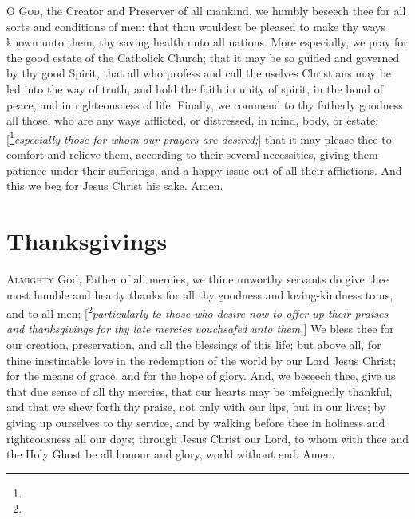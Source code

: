 \lettrine{O}{ God,} the Creator and Preserver of all mankind, we humbly beseech thee for all sorts and conditions of men: that thou wouldest be pleased to make thy ways known unto them, thy saving health unto all nations. More especially, we pray for the good estate of the Catholick Church; that it may be so guided and governed by thy good Spirit, that all who profess and call themselves Christians may be led into the way of truth, and hold the faith in unity of spirit, in the bond of peace,
and in righteousness of life. Finally, we commend to thy fatherly goodness all those, who are any ways afflicted, or distressed, in
mind, body, or estate; [\footnote{}\emph{especially those for whom our prayers are desired;}] that it may please thee to comfort and relieve them, according to their several necessities, giving them patience under their sufferings, and a happy issue out of all their afflictions. And this we beg for Jesus Christ his sake. \R Amen.
\bigskip

\section{Thanksgivings}
\lettrine{A}{lmighty} God, Father of all mercies, we thine unworthy servants do give thee most humble and hearty thanks for all thy goodness and loving-kindness to us, and to all men;
[\footnote{}\emph{particularly to those who desire now to offer up their praises and thanksgivings for thy late mercies vouchsafed unto them.}] We bless thee for our creation, preservation, and all the blessings of this life; but above all, for thine inestimable love in the redemption of the world by our Lord Jesus Christ; for the means of grace, and for the hope of glory. And, we beseech thee, give us that due sense of all thy mercies, that our hearts may be unfeignedly thankful, and that we shew forth thy praise, not only with our lips, but in our lives; by giving up ourselves to thy service, and by walking before thee in holiness and righteousness all our days; through Jesus Christ our Lord, to whom with thee and the Holy Ghost be all honour and glory, world without end. \R Amen.


